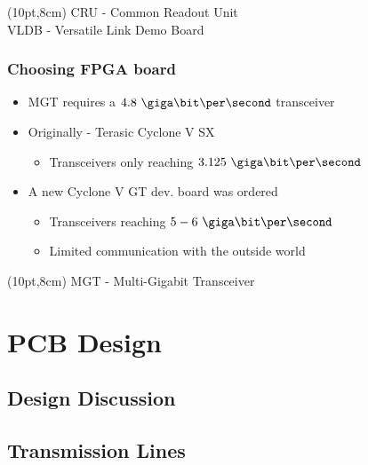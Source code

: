 \documentclass[aspectratio=43]{beamer}
\begin{document}
{\begin{frame}
\begin{textblock*}{\paperwidth}(10pt,8cm)
{\small \color{gray} CRU - Common Readout Unit \\ VLDB - Versatile Link Demo Board}
\end{textblock*}

\end{frame}


\begin{frame}
\frametitle{Choosing FPGA board}

\begin{itemize}
	\item MGT requires a $4.8~\giga\bit\per\second$ transceiver
	\item Originally - Terasic Cyclone V SX
	\begin{itemize}
	\item Transceivers only reaching $3.125~\giga\bit\per\second$
	\end{itemize}
\item A new Cyclone V GT dev. board was ordered
	\begin{itemize}
	\item Transceivers reaching $5-6~\giga\bit\per\second$
	\item Limited communication with the outside world
	\end{itemize}
\end{itemize}

\begin{textblock*}{\paperwidth}(10pt,8cm)
{\small \color{gray} MGT - Multi-Gigabit Transceiver}
\end{textblock*}

\end{frame}


\section{PCB Design}
\subsection{Design Discussion} 
\subsection{Transmission Lines} 
}
\end{document}

